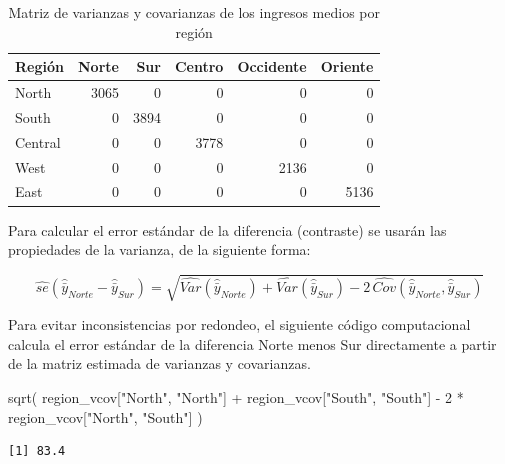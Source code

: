 \documentclass[
  spanish,
  11pt,
  letterpaper,
  oneside,
  open=any]{scrbook}
\newenvironment{Shaded}{\begin{snugshade}}{\end{snugshade}}
\newcommand{\DecValTok}[1]{\textcolor[rgb]{0.68,0.00,0.00}{#1}}
\newcommand{\FunctionTok}[1]{\textcolor[rgb]{0.28,0.35,0.67}{#1}}
\newcommand{\NormalTok}[1]{\textcolor[rgb]{0.00,0.23,0.31}{#1}}
\newcommand{\SpecialCharTok}[1]{\textcolor[rgb]{0.37,0.37,0.37}{#1}}
\newcommand{\StringTok}[1]{\textcolor[rgb]{0.13,0.47,0.30}{#1}}
\begin{document}
{

\begin{longtable}[]{@{}lrrrrr@{}}

\caption{\label{tbl-vcov-region}Matriz de varianzas y covarianzas de los
ingresos medios por región}

\tabularnewline

\toprule\noalign{}
Región & Norte & Sur & Centro & Occidente & Oriente \\
\midrule\noalign{}
\endhead
\bottomrule\noalign{}
\endlastfoot
North & 3065 & 0 & 0 & 0 & 0 \\
South & 0 & 3894 & 0 & 0 & 0 \\
Central & 0 & 0 & 3778 & 0 & 0 \\
West & 0 & 0 & 0 & 2136 & 0 \\
East & 0 & 0 & 0 & 0 & 5136 \\

\end{longtable}

}

Para calcular el error estándar de la diferencia (contraste) se usarán
las propiedades de la varianza, de la siguiente forma:

\[
\widehat{se}\left(\hat{\bar{y}}_{Norte}-\hat{\bar{y}}_{Sur}\right)=\sqrt{\widehat {Var}\left(\hat{\bar{y}}_{Norte}\right)+
\widehat{Var}\left(\hat{\bar{y}}_{Sur}\right)-
2\, \widehat{Cov}\left(\hat{\bar{y}}_{Norte},\hat{\bar{y}}_{Sur}\right)}
\]

Para evitar inconsistencias por redondeo, el siguiente código
computacional calcula el error estándar de la diferencia Norte menos Sur
directamente a partir de la matriz estimada de varianzas y covarianzas.

\begin{Shaded}
\begin{Highlighting}[]
\FunctionTok{sqrt}\NormalTok{(}
\NormalTok{  region\_vcov[}\StringTok{"North"}\NormalTok{, }\StringTok{"North"}\NormalTok{] }\SpecialCharTok{+}
\NormalTok{    region\_vcov[}\StringTok{"South"}\NormalTok{, }\StringTok{"South"}\NormalTok{] }\SpecialCharTok{{-}}
    \DecValTok{2} \SpecialCharTok{*}\NormalTok{ region\_vcov[}\StringTok{"North"}\NormalTok{, }\StringTok{"South"}\NormalTok{]}
\NormalTok{)}
\end{Highlighting}
\end{Shaded}

\begin{verbatim}
[1] 83.4
\end{verbatim}
\end{document}
